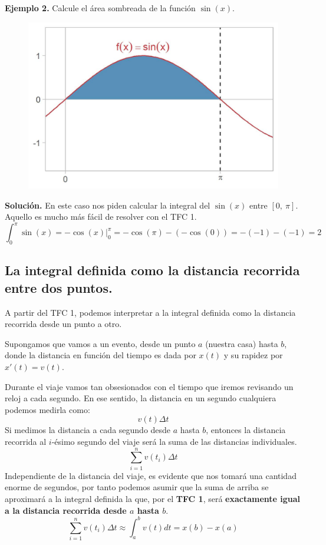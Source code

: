 \documentclass[12pt]{article}
\begin{document}
\textbf{Ejemplo 2.} \quad Calcule el área sombreada de la función $\sin(x)$.

\begin{figure}[hbt!]
\centering
\includegraphics[scale=0.7]{img/def-int-sin.jpg}
\end{figure}

\textbf{Solución.} \quad En este caso nos piden calcular la integral del $\sin(x)$ entre $[0, \ \pi]$. Aquello es mucho más fácil de resolver con el TFC 1.
\[
  \int_{0}^{\pi} \sin(x) = \left.-\cos(x)\right|_{0}^{\pi}
                         = -\cos(\pi) - (-\cos(0))
                         = -(-1) - (-1)
                         = 2
\]

\subsection{La integral definida como la distancia recorrida entre dos puntos.}

A partir del TFC 1, podemos interpretar a la integral definida como la distancia recorrida desde un punto a otro.

Supongamos que vamos a un evento, desde un punto $a$ (nuestra casa) hasta $b$, donde la distancia en función del tiempo es dada por $x(t)$ y su rapidez por $x'(t) = v(t)$.

Durante el viaje vamos tan obsesionados con el tiempo que iremos revisando un reloj a cada segundo. En ese sentido, la distancia en un segundo cualquiera podemos medirla como:
\[
  v(t) \Delta t
\]
Si medimos la distancia a cada segundo desde $a$ hasta $b$, entonces la distancia recorrida al $i$-ésimo segundo del viaje será la suma de las distancias individuales.
\[
  \sum_{i = 1}^{n} v(t_{i}) \Delta t
\]
Independiente de la distancia del viaje, es evidente que nos tomará una cantidad enorme de segundos, por tanto podemos asumir que la suma de arriba se aproximará a la integral definida la que, por el \textbf{TFC 1}, será \textbf{exactamente igual a la distancia recorrida desde $a$ hasta $b$}.
\[
  \sum_{i = 1}^{n} v(t_{i}) \Delta t \approx \int_{a}^{b} v(t) dt = x(b) - x(a)
\]
\end{document}
